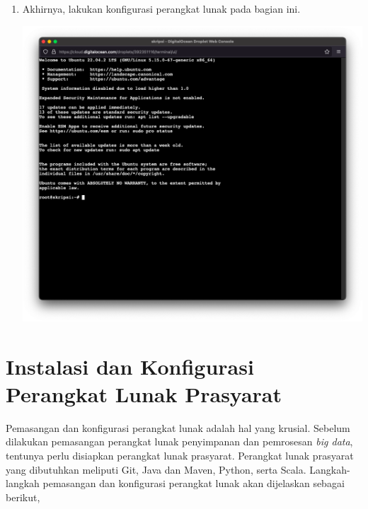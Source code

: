 \begin{enumerate}
\begin{center}
	\end{center} 
  \item Akhirnya, lakukan konfigurasi perangkat lunak pada bagian ini.
	\begin{center}
	\includegraphics[width=1\linewidth]{figures/ch99/ap1/6.png}
	\end{center} 

\end{enumerate}


\chapter{Instalasi dan Konfigurasi Perangkat Lunak Prasyarat}
\label{appendix:B}

Pemasangan dan konfigurasi perangkat lunak adalah hal yang krusial. Sebelum dilakukan pemasangan perangkat lunak penyimpanan dan pemrosesan \textit{big data}, tentunya perlu disiapkan perangkat lunak prasyarat. Perangkat lunak prasyarat yang dibutuhkan meliputi Git, Java dan Maven, Python, serta Scala. Langkah-langkah pemasangan dan konfigurasi perangkat lunak akan dijelaskan sebagai berikut,

